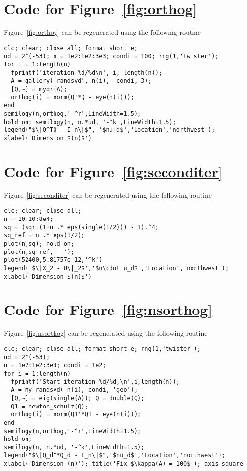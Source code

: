 \section{Code for Figure~\ref{fig:orthog}}\label{app:fig:orthog}
Figure~\ref{fig:orthog} can be regenerated using the following routine 
\begin{lstlisting}
clc; clear; close all; format short e; 
ud = 2^(-53); n = 1e2:1e2:3e3; condi = 100; rng(1,'twister');
for i = 1:length(n)
  fprintf('iteration %d/%d\n', i, length(n));
  A = gallery('randsvd', n(i), -condi, 3);
  [Q,~] = myqr(A); 
  orthog(i) = norm(Q'*Q - eye(n(i)));
end
semilogy(n,orthog,'-^r',LineWidth=1.5); 
hold on; semilogy(n, n.*ud, '-^k',LineWidth=1.5);
legend("$\|Q^TQ - I_n\|$", '$nu_d$','Location','northwest');
xlabel('Dimension $(n)$')
\end{lstlisting}

\section{Code for Figure~\ref{fig:seconditer}}\label{app:seconditer}
Figure~\ref{fig:seconditer} can be regenerated using the following routine 
\begin{lstlisting}
clc; clear; close all;
n = 10:10:8e4;
sq = (sqrt(1+n .* eps(single(1/2))) - 1).^4;
sq_ref = n .* eps(1/2);
plot(n,sq); hold on;
plot(n,sq_ref,'--');
plot(52400,5.81757e-12,'^k')
legend('$\|X_2 - U\|_2$','$n\cdot u_d$','Location','northwest');
xlabel('Dimension $(n)$')
\end{lstlisting}

\section{Code for Figure~\ref{fig:nsorthog}}\label{app:fig:nsorthog}
Figure~\ref{fig:nsorthog} can be regenerated using the following routine 
\begin{lstlisting}
clc; clear; close all; format short e; rng(1,'twister');
ud = 2^(-53); 
n = 1e2:1e2:3e3; condi = 1e2;
for i = 1:length(n)
  fprintf('Start iteration %d/%d,\n',i,length(n));
  A = my_randsvd( n(i), condi, 'geo');
  [Q,~] = eig(single(A)); Q = double(Q);
  Q1 = newton_schulz(Q); 
  orthog(i) = norm(Q1'*Q1 - eye(n(i)));
end
semilogy(n,orthog,'-^r',LineWidth=1.5); 
hold on; 
semilogy(n, n.*ud, '-^k',LineWidth=1.5);
legend("$\|Q_d^*Q_d - I_n\|$",'$nu_d$','Location','northwest'); 
xlabel('Dimension (n)'); title('Fix $\kappa(A) = 100$'); axis square
\end{lstlisting}

